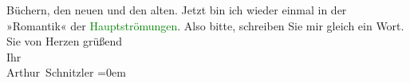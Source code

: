                     Büchern, den neuen und den alten. Jetzt bin ich wieder einmal in der »Romantik«
                    der \textcolor{green}{Hauptströmungen}{}\ledrightnote{\textcolor{green}{Hauptströmungen der Literatur des neunzehnten Jahrhunderts}}.\pend
           \pstart
           Also bitte, schreiben Sie mir gleich ein Wort.\pend
           \pstart
           Sie von Herzen grüßend{\\[\baselineskip]}Ihr{\\[\baselineskip]}\spacefill\mbox{Arthur Schnitzler}\pend
           \leftskip=0em{}\endnumbering{}  
      